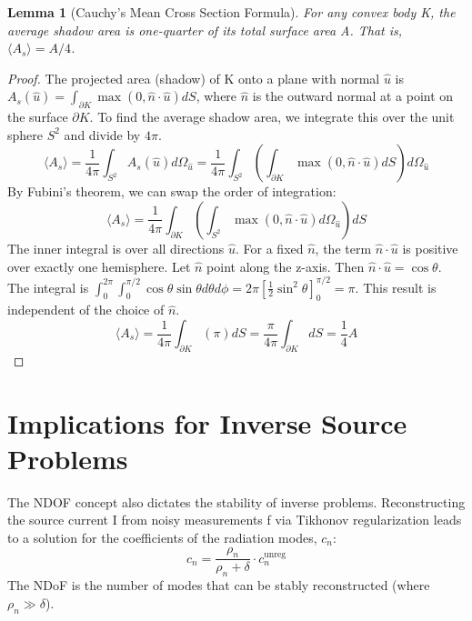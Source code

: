 \documentclass[11pt,a4paper]{article}
\newtheorem{lemma}[theorem]{Lemma}
\begin{document}
\begin{lemma}[Cauchy's Mean Cross Section Formula]
For any convex body K, the average shadow area is one-quarter of its total surface area A. That is, \(\langle A_{s}\rangle=A/4\).
\end{lemma}

\begin{proof}
The projected area (shadow) of K onto a plane with normal \(\hat{u}\) is \(A_{s}(\hat{u})=\int_{\partial K}\max(0,\hat{n}\cdot\hat{u})dS\), where \(\hat{n}\) is the outward normal at a point on the surface \(\partial K\). To find the average shadow area, we integrate this over the unit sphere \(S^{2}\) and divide by \(4\pi\).
\begin{equation}
    \langle A_{s}\rangle=\frac{1}{4\pi}\int_{S^{2}}A_{s}(\hat{u})d\Omega_{\hat{u}}=\frac{1}{4\pi}\int_{S^{2}}\left(\int_{\partial K}\max(0,\hat{n}\cdot\hat{u})dS\right)d\Omega_{\hat{u}}
\end{equation}
By Fubini's theorem, we can swap the order of integration:
\begin{equation}
    \langle A_{s}\rangle=\frac{1}{4\pi}\int_{\partial K}\left(\int_{S^{2}}\max(0,\hat{n}\cdot\hat{u})d\Omega_{\hat{u}}\right)dS
\end{equation}
The inner integral is over all directions \(\hat{u}\). For a fixed \(\hat{n}\), the term \(\hat{n}\cdot\hat{u}\) is positive over exactly one hemisphere. Let \(\hat{n}\) point along the z-axis. Then \(\hat{n}\cdot\hat{u}=\cos\theta\). The integral is \(\int_{0}^{2\pi}\int_{0}^{\pi/2}\cos\theta \sin\theta d\theta d\phi=2\pi\left[\frac{1}{2}\sin^{2}\theta\right]_{0}^{\pi/2}=\pi\). This result is independent of the choice of \(\hat{n}\).
\begin{equation}
    \langle A_{s}\rangle=\frac{1}{4\pi}\int_{\partial K}(\pi)dS=\frac{\pi}{4\pi}\int_{\partial K}dS=\frac{1}{4}A
\end{equation}
\end{proof}

\section{Implications for Inverse Source Problems}

The NDOF concept also dictates the stability of inverse problems. Reconstructing the source current I from noisy measurements f via Tikhonov regularization leads to a solution for the coefficients of the radiation modes, \(c_{n}\):
\begin{equation}
    c_{n}=\frac{\rho_{n}}{\rho_{n}+\delta}\cdot c_{n}^{\text{unreg}}
\end{equation}
The NDoF is the number of modes that can be stably reconstructed (where \(\rho_{n}\gg\delta\)).
\end{document}
